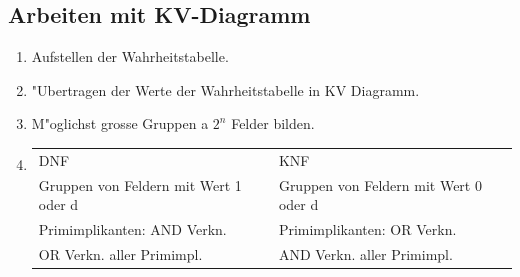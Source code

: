\subsection{Arbeiten mit KV-Diagramm}
\begin{enumerate}
\setlength{\itemsep}{1pt}
  \setlength{\parskip}{0pt}
  \setlength{\parsep}{0pt}
\item Aufstellen der Wahrheitstabelle.\\
\item "Ubertragen der Werte der Wahrheitstabelle in KV Diagramm.\\
\item M"oglichst grosse Gruppen a $2^n$ Felder bilden.\\
\item
\begin{tabular}{ll}
  DNF & KNF \\
  Gruppen von Feldern mit Wert 1 oder d & Gruppen von Feldern mit Wert 0 oder d\\
  Primimplikanten: AND Verkn. & Primimplikanten: OR Verkn.\\
  OR Verkn. aller Primimpl. & AND Verkn. aller Primimpl.\\
\end{tabular}
\end{enumerate}

